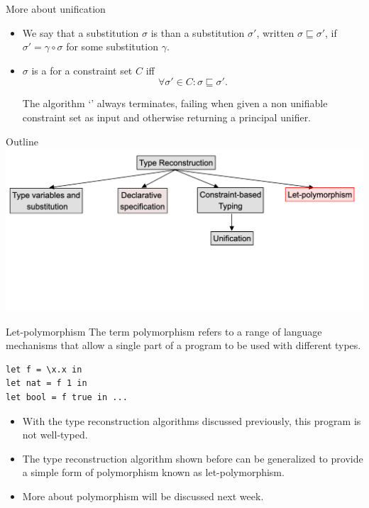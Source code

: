\documentclass[usenames,dvipsnames]{beamer}
\begin{document}
\begin{frame}{More about unification}
\begin{itemize}
\item We say that a substitution $\sigma$ is  than a substitution $\sigma'$, written $\sigma \sqsubseteq \sigma'$, if $\sigma' =  \gamma \circ \sigma$ for some substitution $\gamma$.
\item $\sigma$ is a  for a constraint set $C$ iff $$\forall \sigma' \in C: \sigma \sqsubseteq \sigma'.$$

\begin{theorem}
The algorithm `' always terminates, failing when given a non unifiable constraint set as input and otherwise returning a principal unifier.
\end{theorem}
\end{itemize}
\end{frame}

\begin{frame}{Outline}
\includegraphics[scale=0.25]{img/6}
\end{frame}
\begin{frame}[fragile]{Let-polymorphism}
The term polymorphism refers to a range of language mechanisms that allow a single part of a program to be used with different types.

\begin{example}
\begin{lstlisting}[frame=none]
let f = \x.x in
let nat = f 1 in
let bool = f true in ...
\end{lstlisting}
\end{example}

\begin{itemize}
\item With the type reconstruction algorithms discussed previously, this program is not well-typed.
\item The type reconstruction algorithm shown before can be generalized to provide a simple form of polymorphism known as let-polymorphism.
\item More about polymorphism will be discussed next week.
\end{itemize}
\end{frame}
\end{document}
